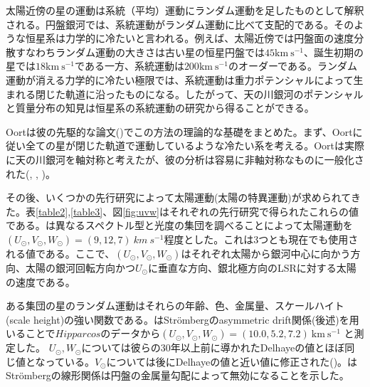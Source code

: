 太陽近傍の星の運動は系統（平均）運動にランダム運動を足したものとして解釈される。円盤銀河では、系統運動がランダム運動に比べて支配的である。そのような恒星系は力学的に冷たいと言われる。例えば、太陽近傍では円盤面の速度分散すなわちランダム運動の大きさは古い星の恒星円盤では$45\mathrm{km\ s^{-1}}$、誕生初期の星では$18\mathrm{km\ s^{-1}}$である一方、系統運動は$200\mathrm{km\ s^{-1}}$のオーダーである。ランダム運動が消える力学的に冷たい極限では、系統運動は重力ポテンシャルによって生まれる閉じた軌道に沿ったものになる。したがって、天の川銀河のポテンシャルと質量分布の知見は恒星系の系統運動の研究から得ることができる。

Oortは彼の先駆的な論文(\cite{Oort1927a})でこの方法の理論的な基礎をまとめた。まず、Oortに従い全ての星が閉じた軌道で運動しているような冷たい系を考える。Oortは実際に天の川銀河を軸対称と考えたが、彼の分析は容易に非軸対称なものに一般化された(\cite{Ogrodnikoff1932}, \cite{Milne1935}, \cite{Chandra42})。

その後、いくつかの先行研究によって太陽運動(太陽の特異運動)が求められてきた。表\ref{table2},\ref{table3}、図\ref{fig:uvw}はそれぞれの先行研究で得られたこれらの値である。\cite{Delhaye1965}は異なるスペクトル型と光度の集団を調べることによって太陽運動を$(U_{\odot},V_{\odot},W_{\odot})=(9,12,7)\ km\ s^{-1}$程度とした。これは3つとも現在でも使用される値である。ここで、$(U_{\odot},V_{\odot},W_{\odot})$はそれぞれ太陽から銀河中心に向かう方向、太陽の銀河回転方向かつ$U_{\odot}$に垂直な方向、銀北極方向のLSRに対する太陽の速度である。

ある集団の星のランダム運動はそれらの年齢、色、金属量、スケールハイト (scale height)の強い関数である。\cite{DB1998}はStr\"{o}mbergのasymmetric drift関係(後述)を用いることで$Hipparcos$のデータから$(U_{\odot},V_{\odot},W_{\odot}) = (10.0, 5.2, 7.2)\ \mathrm{km\ s^{-1}}$ と測定した。
$U_{\odot}, W_{\odot}$については彼らの30年以上前に導かれたDelhayeの値とほぼ同じ値となっている。$V_{\odot}$については後にDelhayeの値と近い値に修正された(\cite{Schonrich2010})。\cite{Schonrich2010}はStr\"{o}mbergの線形関係は円盤の金属量勾配によって無効になることを示した。

\def\arraybackslash{\let\\\tabularnewline}


